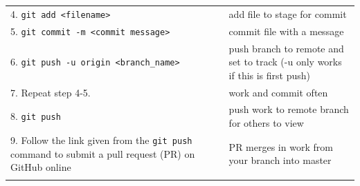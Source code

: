 \documentclass[]{book}
\begin{document}
\begin{longtable}[]{@{}ll@{}}
\begin{minipage}[t]{0.34\columnwidth}\raggedright
4. \texttt{git\ add\ \textless{}filename\textgreater{}}\strut
\end{minipage} & \begin{minipage}[t]{0.60\columnwidth}\raggedright
add file to stage for commit\strut
\end{minipage}\tabularnewline
\begin{minipage}[t]{0.34\columnwidth}\raggedright
5. \texttt{git\ commit\ -m\ \textless{}commit\ message\textgreater{}}\strut
\end{minipage} & \begin{minipage}[t]{0.60\columnwidth}\raggedright
commit file with a message\strut
\end{minipage}\tabularnewline
\begin{minipage}[t]{0.34\columnwidth}\raggedright
6. \texttt{git\ push\ -u\ origin\ \textless{}branch\_name\textgreater{}}\strut
\end{minipage} & \begin{minipage}[t]{0.60\columnwidth}\raggedright
push branch to remote and set to track (-u only works if this is first push)\strut
\end{minipage}\tabularnewline
\begin{minipage}[t]{0.34\columnwidth}\raggedright
7. Repeat step 4-5.\strut
\end{minipage} & \begin{minipage}[t]{0.60\columnwidth}\raggedright
work and commit often\strut
\end{minipage}\tabularnewline
\begin{minipage}[t]{0.34\columnwidth}\raggedright
8. \texttt{git\ push}\strut
\end{minipage} & \begin{minipage}[t]{0.60\columnwidth}\raggedright
push work to remote branch for others to view\strut
\end{minipage}\tabularnewline
\begin{minipage}[t]{0.34\columnwidth}\raggedright
9. Follow the link given from the \texttt{git\ push} command to submit a pull request (PR) on GitHub online\strut
\end{minipage} & \begin{minipage}[t]{0.60\columnwidth}\raggedright
PR merges in work from your branch into master\strut
\end{minipage}\tabularnewline
\begin{minipage}[t]{0.34\columnwidth}\raggedright

\end{minipage}
\end{longtable}
\end{document}
